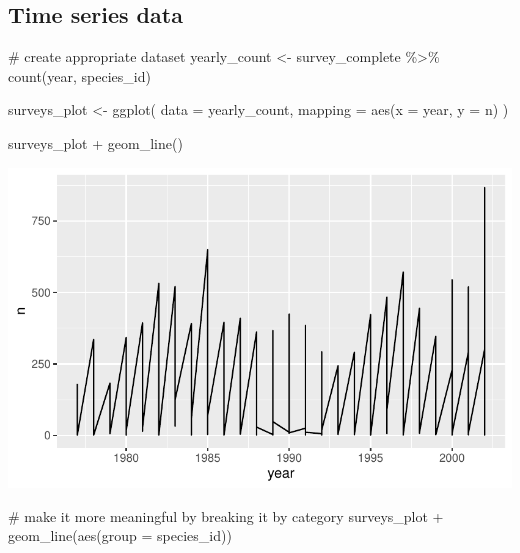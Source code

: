 \documentclass[
  letterpaper,
  DIV=11,
  numbers=noendperiod]{scrreprt}
\newenvironment{Shaded}{\begin{snugshade}}{\end{snugshade}}
\newcommand{\AttributeTok}[1]{\textcolor[rgb]{0.40,0.45,0.13}{#1}}
\newcommand{\CommentTok}[1]{\textcolor[rgb]{0.37,0.37,0.37}{#1}}
\newcommand{\FunctionTok}[1]{\textcolor[rgb]{0.28,0.35,0.67}{#1}}
\newcommand{\NormalTok}[1]{\textcolor[rgb]{0.00,0.23,0.31}{#1}}
\newcommand{\OtherTok}[1]{\textcolor[rgb]{0.00,0.23,0.31}{#1}}
\newcommand{\SpecialCharTok}[1]{\textcolor[rgb]{0.37,0.37,0.37}{#1}}
\begin{document}
\subsection{Time series data}\label{time-series-data}

\begin{Shaded}
\begin{Highlighting}[]
\CommentTok{\# create appropriate dataset}
\NormalTok{yearly\_count }\OtherTok{\textless{}{-}}\NormalTok{ survey\_complete }\SpecialCharTok{\%\textgreater{}\%}
  \FunctionTok{count}\NormalTok{(year, species\_id)}

\NormalTok{surveys\_plot }\OtherTok{\textless{}{-}} \FunctionTok{ggplot}\NormalTok{(}
  \AttributeTok{data =}\NormalTok{ yearly\_count,}
  \AttributeTok{mapping =} \FunctionTok{aes}\NormalTok{(}\AttributeTok{x =}\NormalTok{ year, }\AttributeTok{y =}\NormalTok{ n)}
\NormalTok{)}

\NormalTok{surveys\_plot }\SpecialCharTok{+} \FunctionTok{geom\_line}\NormalTok{()}
\end{Highlighting}
\end{Shaded}

\includegraphics{src/notebooks/r_files/figure-pdf/unnamed-chunk-48-1.pdf}

\begin{Shaded}
\begin{Highlighting}[]
\CommentTok{\# make it more meaningful by breaking it by category}
\NormalTok{surveys\_plot }\SpecialCharTok{+} \FunctionTok{geom\_line}\NormalTok{(}\FunctionTok{aes}\NormalTok{(}\AttributeTok{group =}\NormalTok{ species\_id))}
\end{Highlighting}
\end{Shaded}
\end{document}
